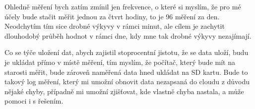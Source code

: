 
Ohledně měření bych zatím zmínil jen frekvence, o které si myslím, že pro mé účely bude stačit měřit jednou za čtvrt 
hodiny, to je 96 měření za den. Neodchytím tím sice drobné výkyvy v rámci minut, ale cílem je zachytit dlouhodobý průběh 
hodnot v rámci dne, kdy mne tak drobné výkyvy nezajímají. %

Co se týče uložení dat, abych zajistil stoprocentní jistotu, že se data uloží, budu je ukládat přímo v místě měření, tím 
myslím, že počítač, který bude mít na starosti měřit, bude zároveň naměřená data hned ukládat na SD kartu. Bude to 
takový log měření, který mi umožní obnovit data nezapsaná do cloudu z důvodu nějaké chyby, případně mi umožní zjišťovat, 
kde vlastně chyba nastala, a může pomoci i s řešením.%

